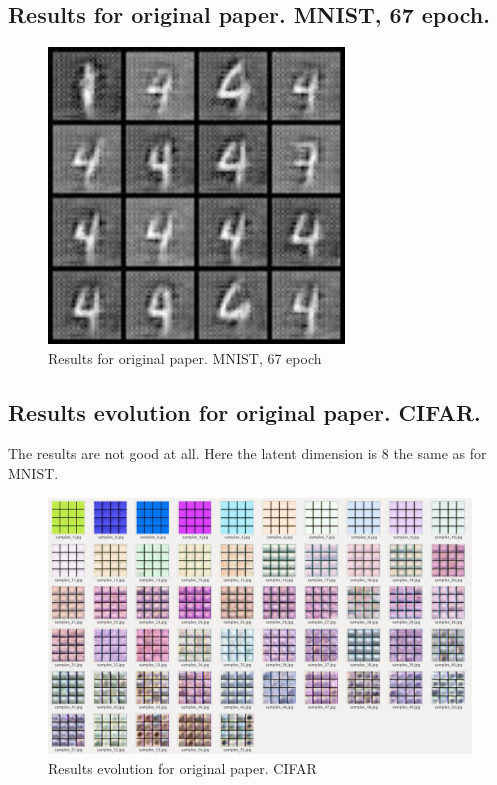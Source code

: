 \documentclass{article}
\begin{document}
    \subsection{Results for original paper. MNIST, 67 epoch.}
    \begin{figure}[!h]
        \includegraphics[width=0.7\textwidth]{figures/samples_67.jpg}
        \caption{Results for original paper. MNIST, 67 epoch}
    \end{figure}

    \subsection{Results evolution for original paper. CIFAR.}
    The results are not good at all. Here the latent dimension is 8 the same as for MNIST.
    \begin{figure}[!h]
        \includegraphics[width=\textwidth]{figures/CIFAR-original-evolution.png}
        \caption{Results evolution for original paper. CIFAR}
    \end{figure}
\end{document}
